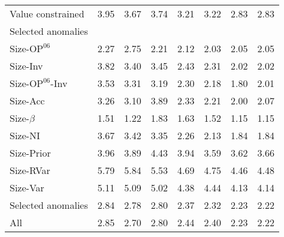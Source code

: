 \begin{table}[!ht]
\begin{tabular}{lrrrrrrr}
    
    Value constrained  & 3.95  & 3.67  & 3.74  & 3.21  & 3.22  & 2.83  & 2.83  \\
    [1em]
  
    
    \multicolumn{8}{l}{Selected anomalies} \\
    Size-$\text{OP}^{06}$  & 2.27  & 2.75  & 2.21  & 2.12  & 2.03  & 2.05  & 2.05  \\
    
  
    
    
    Size-Inv  & 3.82  & 3.40  & 3.45  & 2.43  & 2.31  & 2.02  & 2.02  \\
    
  
    
    
    Size-$\text{OP}^{06}$-Inv  & 3.53  & 3.31  & 3.19  & 2.30  & 2.18  & 1.80  & 2.01  \\
    
  
    
    
    Size-Acc  & 3.26  & 3.10  & 3.89  & 2.33  & 2.21  & 2.00  & 2.07  \\
    
  
    
    
    Size-$\beta$  & 1.51  & 1.22  & 1.83  & 1.63  & 1.52  & 1.15  & 1.15  \\
    
  
    
    
    Size-NI  & 3.67  & 3.42  & 3.35  & 2.26  & 2.13  & 1.84  & 1.84  \\
    
  
    
    
    Size-Prior  & 3.96  & 3.89  & 4.43  & 3.94  & 3.59  & 3.62  & 3.66  \\
    
  
    
    
    Size-RVar  & 5.79  & 5.84  & 5.53  & 4.69  & 4.75  & 4.46  & 4.48  \\
    
  
    
    
    Size-Var  & 5.11  & 5.09  & 5.02  & 4.38  & 4.44  & 4.13  & 4.14  \\
    
  
    
    
    Selected anomalies  & 2.84  & 2.78  & 2.80  & 2.37  & 2.32  & 2.23  & 2.22  \\
    [1em]
  
    
    
    All  & 2.85  & 2.70  & 2.80  & 2.44  & 2.40  & 2.23  & 2.22  \\
    
  
  \bottomrule
\end{tabular}
\label{tbl:GRS}
\end{table}
